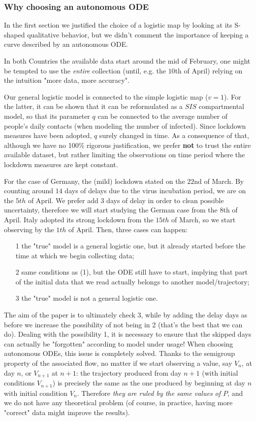 \documentclass[8pt]{article}
\begin{document}
\subsubsection{Why choosing an autonomous ODE}
In the first section we justified the choice of a logistic map by looking
at its S-shaped qualitative behavior, but we didn't comment the
importance of keeping
a curve described by an autonomous ODE.


In both Countries the available data start around the mid
of February, one might be tempted to use the \emph{entire}
collection (until, e.g. the $10$th of April)
relying on the intuition "more data, more accuracy".


Our general logistic model is connected to the simple
logistic map ($v = 1$). For the latter, it can be shown that
it can be reformulated as a $SIS$ compartmental model,
so that its parameter $q$ can be connected
to the average number of people's
daily contacts (when modeling the number of infected).
Since lockdown measures have been adopted,
$q$ surely changed in time. As a consequence of that, although
we have no 100\% rigorous justification,
we prefer \textbf{not} to trust the entire available dataset, but rather
limiting the observations on time period where the lockdown
measures are kept constant.


For the case of Germany, the (mild) lockdown stated on the $22$nd of March.
By counting around $14$ days of delays due to the virus incubation period,
we are on the $5th$ of April. We prefer add $3$ days of delay in order
to clean possible uncertainty, therefore we will start studying the German
case from the $8$th of April.
Italy adopted its strong lockdown from the $15th$ of March, so we start
observing by the $1th$ of April. Then, three cases can happen:
\begin{itemize}
	\item[1] the "true" model is a general logistic one,
		but it already started before the time at which
		we begin collecting data;
	\item[2] same conditions as (1), but the ODE still have
		to start, implying that part of the
		initial data that we read actually belongs to
		another model/trajectory;
	\item[3] the "true" model is not a general logistic one.
\end{itemize}


The aim of the paper is to ultimately check 3,
while by adding the delay days as before we increase the
possibility of not being in 2 (that's the best that we can do).
Dealing with the possibility 1,
it is necessary to ensure that the skipped days
can actually be "forgotten" according to model under usage!
When choosing autonomous ODEs, this issue is completely solved.
Thanks to the semigroup property of the associated flow,
no matter if we start observing a value, say $V_n$, at 
day $n$, or $V_{n+1}$ at $n+1$: 
the trajectory produced from day $n+1$ (with initial
conditions $V_{n+1}$) is precisely the same as the one
produced by beginning at day $n$ with initial condition $V_n$.
Therefore \emph{they are ruled by the same values of $P$},
and we do not have any theoretical problem (of course, in practice,
having more "correct" data might improve the results).
\end{document}
